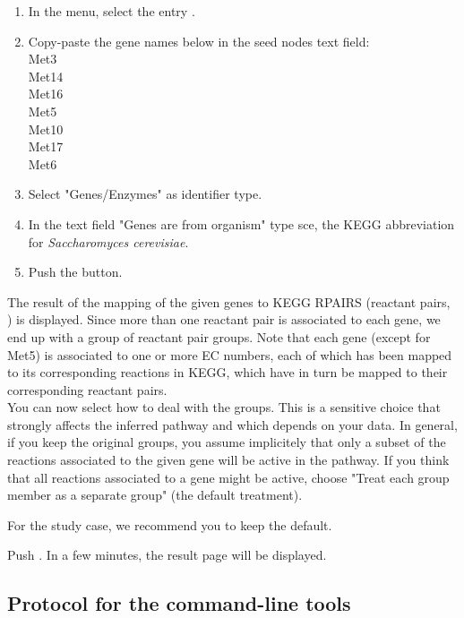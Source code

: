 \begin{enumerate}

\item In the \neat  menu, select the entry .

\item Copy-paste the gene names below in the seed nodes text field:\\
Met3\\
Met14\\
Met16\\
Met5\\
Met10\\
Met17\\
Met6

\item Select "Genes/Enzymes" as identifier type.

\item In the text field "Genes are from organism" type sce, the KEGG abbreviation for \textit{Saccharomyces cerevisiae}.

\item Push the  button.

\end{enumerate}

The result of the mapping of the given genes to KEGG RPAIRS (reactant pairs, \cite{Kotera2004}) is displayed.
Since more than one reactant pair is associated to each gene, we end up with a group of reactant pair groups.
Note that each gene (except for Met5) is associated to one or more EC numbers, each of which has been mapped
to its corresponding reactions in KEGG, which have in turn be mapped to their corresponding reactant pairs.\\

You can now select how to deal with the groups. This is a sensitive choice that strongly
affects the inferred pathway and which depends on your data.
In general, if you keep the original groups, you assume implicitely that only
a subset of the reactions associated to the given gene will be active in the pathway.
If you think that all reactions associated to a gene might be active,
choose "Treat each group member as a separate group" (the default treatment).

For the study case, we recommend you to keep the default.

Push . In a few minutes, the result page will be displayed.


\subsection{Protocol for the command-line tools}

